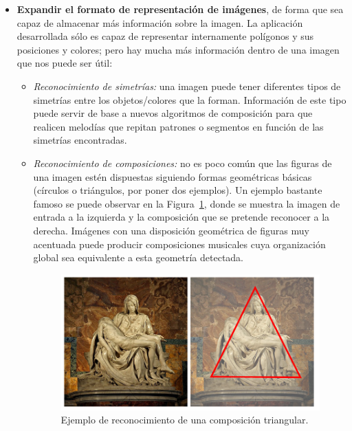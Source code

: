 \begin{itemize}
\item\textbf{Expandir el formato de representación de imágenes}, de forma que sea capaz de almacenar más información sobre la imagen. La aplicación desarrollada sólo es capaz de representar internamente polígonos y sus posiciones y colores; pero hay mucha más información dentro de una imagen que nos puede ser útil:

	\begin{itemize}
	
		\item\textit{Reconocimiento de simetrías:} una imagen puede tener diferentes tipos de simetrías entre los objetos/colores que la forman. Información de este tipo puede servir de base a nuevos algoritmos de composición para que realicen melodías que repitan patrones o segmentos en función de las simetrías encontradas.
		
		\item\textit{Reconocimiento de composiciones:} no es poco común que las figuras de una imagen estén dispuestas siguiendo formas geométricas básicas (círculos o triángulos, por poner dos ejemplos). Un ejemplo bastante famoso se puede observar en la Figura~\ref{fig:composition}, donde se muestra la imagen de entrada a la izquierda y la composición que se pretende reconocer a la derecha. Imágenes con una disposición geométrica de figuras muy acentuada puede producir composiciones musicales cuya organización global sea equivalente a esta geometría detectada.\\
			
			\begin{figure}[!htbp]
			\centering
			\includegraphics[scale=0.40]{graphics/composition2.png}
			\caption{Ejemplo de reconocimiento de una composición triangular.}
			\label{fig:composition}
			\end{figure}
		

\end{itemize}
\end{itemize}
